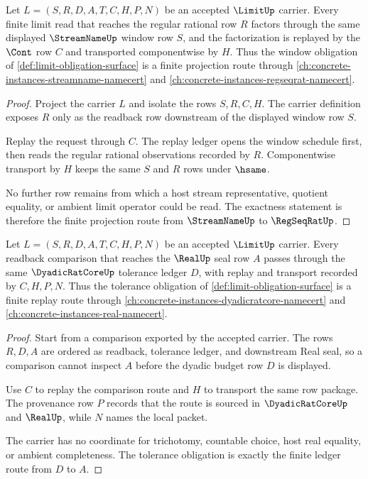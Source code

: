 \begin{theorem}
\label{thm:limit-finite-window-exactness}
Let $L=(S,R,D,A,T,C,H,P,N)$ be an accepted $\LimitUp$ carrier. Every finite limit read that reaches the regular rational row $R$ factors through the same displayed $\StreamNameUp$ window row $S$, and the factorization is replayed by the $\Cont$ row $C$ and transported componentwise by $H$. Thus the window obligation of \autoref{def:limit-obligation-surface} is a finite projection route through \autoref{ch:concrete-instances-streamname-namecert} and \autoref{ch:concrete-instances-regseqrat-namecert}.
\end{theorem}
\begin{proof}
Project the carrier $L$ and isolate the rows $S,R,C,H$. The carrier definition exposes $R$ only as the readback row downstream of the displayed window row $S$.

Replay the request through $C$. The replay ledger opens the window schedule first, then reads the regular rational observations recorded by $R$. Componentwise transport by $H$ keeps the same $S$ and $R$ rows under $\hsame$.

No further row remains from which a host stream representative, quotient equality, or ambient limit operator could be read. The exactness statement is therefore the finite projection route from $\StreamNameUp$ to $\RegSeqRatUp$.
\end{proof}

\begin{theorem}
\label{thm:limit-tolerance-ledger-exactness}
Let $L=(S,R,D,A,T,C,H,P,N)$ be an accepted $\LimitUp$ carrier. Every readback comparison that reaches the $\RealUp$ seal row $A$ passes through the same $\DyadicRatCoreUp$ tolerance ledger $D$, with replay and transport recorded by $C,H,P,N$. Thus the tolerance obligation of \autoref{def:limit-obligation-surface} is a finite replay route through \autoref{ch:concrete-instances-dyadicratcore-namecert} and \autoref{ch:concrete-instances-real-namecert}.
\end{theorem}
\begin{proof}
Start from a comparison exported by the accepted carrier. The rows $R,D,A$ are ordered as readback, tolerance ledger, and downstream Real seal, so a comparison cannot inspect $A$ before the dyadic budget row $D$ is displayed.

Use $C$ to replay the comparison route and $H$ to transport the same row package. The provenance row $P$ records that the route is sourced in $\DyadicRatCoreUp$ and $\RealUp$, while $N$ names the local packet.

The carrier has no coordinate for trichotomy, countable choice, host real equality, or ambient completeness. The tolerance obligation is exactly the finite ledger route from $D$ to $A$.
\end{proof}

